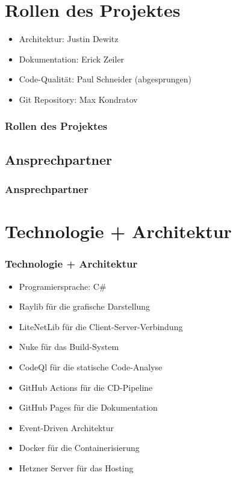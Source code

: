\documentclass{beamer}
\begin{document}
\section{Rollen des Projektes}
\begin{frame}
  \begin{itemize}
    \item Architektur: Justin Dewitz
    \item Dokumentation: Erick Zeiler
    \item Code-Qualität: Paul Schneider (abgesprungen)
    \item Git Repository: Max Kondratov
  \end{itemize}
\frametitle{Rollen des Projektes}

\end{frame}

\subsection{Ansprechpartner}
\begin{frame}
\frametitle{Ansprechpartner}

\end{frame}

\section{Technologie + Architektur}
\begin{frame}
\frametitle{Technologie + Architektur}
  \begin{itemize}
    \item Programiersprache: C\#
    \item Raylib für die grafische Darstellung
    \item LiteNetLib für die Client-Server-Verbindung
    \item Nuke für das Build-System
    \item CodeQl für die statische Code-Analyse
    \item GitHub Actions für die CD-Pipeline
    \item GitHub Pages für die Dokumentation
    \item Event-Driven Architektur
    \item Docker für die Containerisierung
    \item Hetzner Server für das Hosting
  \end{itemize}
\end{frame}
\end{document}
